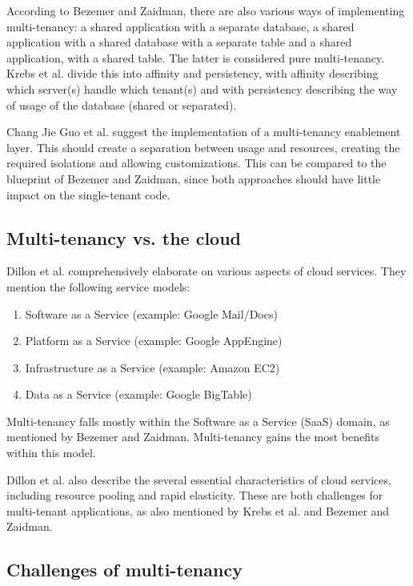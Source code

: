 According to Bezemer and Zaidman\cite{bezemer2010multi}, there are also various ways of implementing multi-tenancy: a shared application with a separate database, a shared application with a shared database with a separate table and a shared application, with a shared table. The latter is considered pure multi-tenancy. Krebs et al.\cite{krebs2012architecture} divide this into affinity and persistency, with affinity describing which server(s) handle which tenant(s) and with persistency describing the way of usage of the database (shared or separated).

Chang Jie Guo et al.\cite{guo2007framework} suggest the implementation of a multi-tenancy enablement layer. This should create a separation between usage and resources, creating the required isolations and allowing customizations. This can be compared to the blueprint of Bezemer and Zaidman\cite{bezemer2010multi}, since both approaches should have little impact on the single-tenant code.

\subsection{Multi-tenancy vs. the cloud}

Dillon et al.\cite{dillon2010cloud} comprehensively elaborate on various aspects of cloud services. They mention the following service models: 
\begin{enumerate}
\item Software as a Service (example: Google Mail/Docs)
\item Platform as a Service (example: Google AppEngine)
\item Infrastructure as a Service (example: Amazon EC2)
\item Data as a Service (example: Google BigTable)
\end{enumerate}

Multi-tenancy falls mostly within the Software as a Service (SaaS) domain, as mentioned by Bezemer and Zaidman\cite{bezemer2010multi}. Multi-tenancy gains the most benefits within this model.

Dillon et al.\cite{dillon2010cloud} also describe the several essential characteristics of cloud services, including resource pooling and rapid elasticity. These are both challenges for multi-tenant applications, as also mentioned by Krebs et al.\cite{krebs2012architecture} and Bezemer and Zaidman\cite{bezemer2010multi}.

\subsection{Challenges of multi-tenancy}

